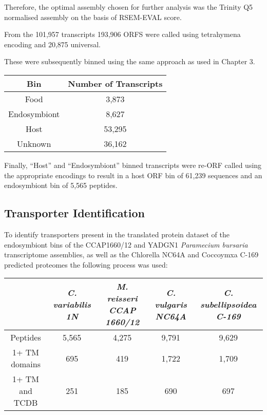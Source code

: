 Therefore, the optimal assembly chosen for further analysis was the Trinity
Q5 normalised assembly on the basis of RSEM-EVAL score. 

From the 101,957 transcripts 193,906 ORFS were called using tetrahymena 
encoding and 20,875 universal.

These were subsequently binned using the same approach as used in 
Chapter 3. 

\begin{table}
    \centering
    \begin{tabular}{|c|c|}
        \hline
        \textbf{Bin} & \textbf{Number of Transcripts} \\
        \hline
        Food & 3,873 \\
        Endosymbiont & 8,627 \\
        Host & 53,295 \\
        Unknown & 36,162 \\
        \hline
    \end{tabular}
\end{table}

Finally, ``Host'' and ``Endosymbiont'' binned transcripts 
were re-ORF called using the appropriate encodings to result in a 
host ORF bin of 61,239 sequences
and an endosymbiont bin of 5,565 peptides. 

\subsection{Transporter Identification}

To identify transporters present in the translated protein dataset of the 
endosymbiont bins of the CCAP1660/12 and YADGN1 
\textit{Paramecium bursaria} transcriptome assemblies, as well as the Chlorella NC64A 
and Coccoymxa C-169 predicted proteomes the following process was used:

\begin{table}
    \centering
    \begin{tabular}{|c|c|c|c|c|}
        \hline
        & \textit{C. variabilis 1N} & \textit{M. reisseri CCAP 1660/12} & \textit{C. vulgaris NC64A} & \textit{C. subellipsoidea C-169} \\
        \hline
        Peptides        & 5,565 & 4,275 & 9,791 & 9,629 \\
        1+ TM domains   & 695 & 419 & 1,722 & 1,709 \\
        1+ TM and TCDB  & 251 & 185 & 690 & 697 \\
        \hline
    \end{tabular}
\end{table}






